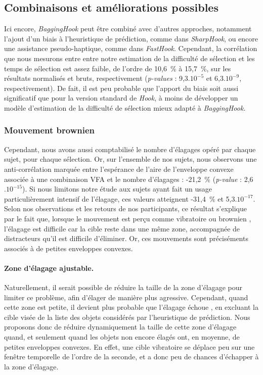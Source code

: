 	\subsection{Combinaisons et améliorations possibles}
	Ici encore, \emph{BaggingHook} peut être combiné avec d'autres approches, notamment l'ajout d'un biais à l'heuristique de prédiction, comme dans \emph{SharpHook}, ou encore une assistance pseudo-haptique, comme dans \emph{FastHook}. Cependant, la corrélation que nous mesurons entre entre notre estimation de la difficulté de sélection et les temps de sélection est assez faible, de l'ordre de 10,6~\%{} à 15,7~\%{}, sur les résultats normalisés et bruts, respectivement (\emph{p-values} : 9,3$.10^{-5}$ et 6,3$.10^{-9}$, respectivement). De fait, il est peu probable que l'apport du biais soit aussi significatif que pour la version standard de \emph{Hook}, à moins de développer un modèle d'estimation de la difficulté de sélection mieux adapté à \emph{BaggingHook}.
	
	\subsubsection{Mouvement brownien}
	Cependant, nous avons aussi comptabilisé le nombre d'élagages opéré par chaque sujet, pour chaque sélection. Or, sur l'ensemble de nos sujets, nous observons une anti-corrélation marquée entre l'espérance de l'aire de l'enveloppe convexe associée à une combinaison VFA et le nombre d'élagages : -21,2~\%{} (\emph{p-value} : 2,6$.10^{-15}$). Si nous limitons notre étude aux sujets ayant fait un usage particulièrement intensif de l'élagage, ces valeurs atteignent -31,4~\%{} et 5,3$.10^{-17}$. Selon nos observations et les retours de nos participants, ce résultat s'explique par le fait que, lorsque le mouvement est perçu comme \og vibratoire \fg{} ou \og brownien \fg{}, l'élagage est difficile car la cible reste dans une même zone, accompagnée de distracteurs qu'il est difficile d'éliminer. Or, ces mouvements sont préciséments associés à de petites enveloppes convexes.
	
	\paragraph{Zone d'élagage ajustable.}
	Naturellement, il serait possible de réduire la taille de la zone d'élagage pour limiter ce problème, afin d'élager de manière plus agressive. Cependant, quand cette zone est petite, il devient plus probable que l'élagage \og échoue \fg{}, en excluant la cible visée de la liste des objets considérés par l'heuristique de prédiction. Nous proposons donc de réduire dynamiquement la taille de cette zone d'élagage quand, et seulement quand les objets non encore élagés ont, en moyenne, de petites enveloppes convexes. En effet, une cible vibratoire se déplace peu sur une fenêtre temporelle de l'ordre de la seconde, et a donc peu de chances d'échapper à la zone d'élagage.
	
